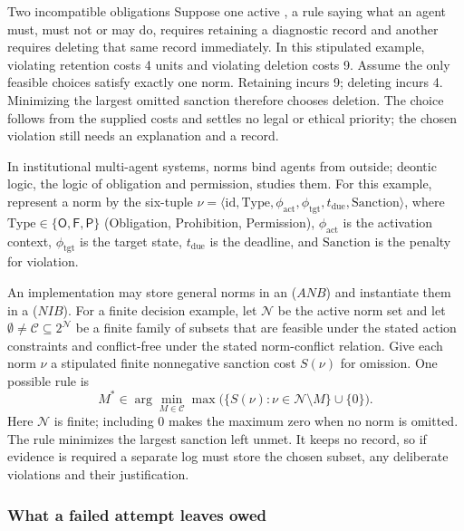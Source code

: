 \begin{pdexample}{Two incompatible obligations}
Suppose one active , a rule saying what an agent must, must not or
may do, requires retaining a diagnostic record and another requires deleting
that same record immediately. In this stipulated example,
violating retention costs 4 units and violating deletion costs 9. Assume the
only feasible choices satisfy exactly one norm. Retaining incurs 9; deleting
incurs 4. Minimizing the largest omitted sanction therefore chooses deletion.
The choice follows from the supplied costs and settles no legal or ethical
priority; the chosen violation still needs an explanation and a record.
\end{pdexample}

In institutional multi-agent systems, norms bind agents from outside; deontic logic, the logic of obligation and permission, studies them. For this example, represent a norm by the six-tuple $\nu = \langle \mathrm{id}, \mathrm{Type}, \phi_{\text{act}}, \phi_{\text{tgt}}, t_{\text{due}}, \mathrm{Sanction} \rangle$, where $\mathrm{Type} \in \{\mathsf{O}, \mathsf{F}, \mathsf{P}\}$ (Obligation, Prohibition, Permission), $\phi_{\text{act}}$ is the activation context, $\phi_{\text{tgt}}$ is the target state, $t_{\text{due}}$ is the deadline, and $\mathrm{Sanction}$ is the penalty for violation.

An implementation may store general norms in an 
($ANB$) and instantiate them in a  ($NIB$).
For a finite decision example, let $\mathcal N$ be the active norm set and let
$\emptyset\ne\mathcal C\subseteq 2^{\mathcal N}$ be a finite family of subsets that
are feasible under the stated action constraints and conflict-free under the
stated norm-conflict relation. Give each norm $\nu$ a stipulated finite nonnegative
sanction cost $S(\nu)$ for omission. One possible 
rule is
\begin{equation}
M^*\in\arg\min_{M\in\mathcal C}
\max\bigl(\{S(\nu):\nu\in\mathcal N\setminus M\}\cup\{0\}\bigr).
\end{equation}
Here $\mathcal N$ is finite; including $0$ makes the maximum zero when no norm
is omitted. The rule minimizes the largest sanction left unmet. It keeps no
record, so if evidence is required a separate log must store the chosen
subset, any deliberate violations and their justification.

\subsubsection{What a failed attempt leaves owed}
\label{sec:why-bdi-matters}

